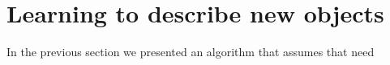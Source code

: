 \section{Learning to describe new objects}
\label{sec:learning}

In the previous section we presented an algorithm that assumes that need 
